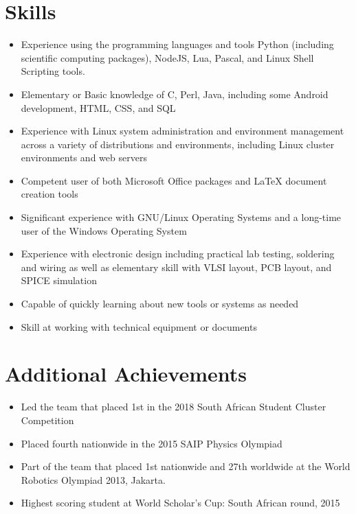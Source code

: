 \documentclass[10pt,a4paper,notitlepage]{article}
\begin{document}
\section*{Skills}
\begin{itemize}
	\setlength\itemsep{0.02em}
    \item Experience using the programming languages and tools Python (including scientific computing packages), NodeJS, Lua, Pascal, and Linux Shell Scripting tools.
    \item Elementary or Basic knowledge of C, Perl, Java, including some Android development, HTML, CSS, and SQL
    \item Experience with Linux system administration and environment management across a variety of distributions and environments, including Linux cluster environments and web servers
    \item Competent user of both Microsoft Office packages and LaTeX document creation tools
    \item Significant experience with GNU/Linux Operating Systems and a long-time user of the Windows Operating System
    \item Experience with electronic design including practical lab testing, soldering and wiring as well as elementary skill with VLSI layout, PCB layout, and SPICE simulation
    \item Capable of quickly learning about new tools or systems as needed
    \item Skill at working with technical equipment or documents
\end{itemize}

\section*{Additional Achievements}
\begin{itemize}
	\setlength\itemsep{0.02em}
    \item Led the team that placed 1st in the 2018 South African Student Cluster Competition
    \item Placed fourth nationwide in the 2015 SAIP Physics Olympiad
    \item Part of the team that placed 1st nationwide and 27th worldwide at the World Robotics Olympiad 2013, Jakarta.
    \item Highest scoring student at World Scholar's Cup: South African round, 2015
\end{itemize}
\end{document}
